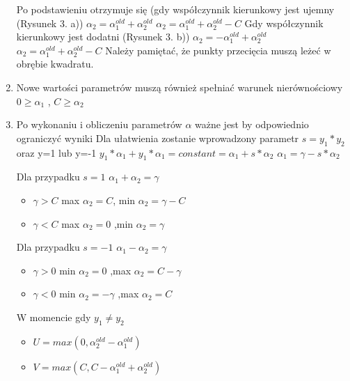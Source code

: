 \documentclass[11pt]{article}
\begin{document}
\begin{enumerate}
Po podstawieniu otrzymuje się (gdy współczynnik kierunkowy jest ujemny (Rysunek 3. a))
\newline 
$\alpha_{2} = \alpha_{1}^{old} + \alpha_{2}^{old}$
$\alpha_{2} = \alpha_{1}^{old} + \alpha_{2}^{old}-C$
\newline Gdy współczynnik kierunkowy jest dodatni (Rysunek 3. b))
\newline
$\alpha_{2} = -\alpha_{1}^{old} + \alpha_{2}^{old}$
$\alpha_{2} = \alpha_{1}^{old} + \alpha_{2}^{old}-C$
\newline Należy pamiętać, że punkty przecięcia muszą leżeć w obrębie kwadratu. 

\item Nowe wartości parametrów muszą również spełniać warunek nierównościowy
$0\ge\alpha_{1}$ ,
$C\ge\alpha_{2}$
\item Po wykonaniu i obliczeniu parametrów  $\alpha$ ważne jest by odpowiednio ograniczyć wyniki
\newline 
Dla ułatwienia zostanie wprowadzony parametr $s=y_{1}*y_{2}$ oraz y=1 lub y=-1 
\newline 
$y_{1}*\alpha_{1} + y_{1}*\alpha_{1} = constant = \alpha_{1} + s*\alpha_{2}$
\newline
$\alpha_{1} = \gamma - s*\alpha_{2}$

Dla przypadku $s=1$   
 \newline $\alpha_{1}+\alpha_{2} = \gamma$
 \begin{itemize}
\item $\gamma > C $ max $\alpha_{2} = C $, min $ \alpha_{2} = \gamma - C$
\item $\gamma < C$  max $\alpha_{2} = 0$ ,min  $\alpha_{2} = \gamma$
\end{itemize}
Dla przypadku $s=-1$
\newline $\alpha_{1}-\alpha_{2} = \gamma$
\begin{itemize}
\item $\gamma > 0$ min $\alpha_{2} = 0 $ ,max  $\alpha_{2} = C -\gamma $
\item $\gamma < 0$ min $\alpha_{2} = -\gamma$ ,max  $\alpha_{2} = C$
\end{itemize}
W momencie gdy  $y_{1}\neq y_{2}$ 
\begin{itemize}
 \item$ U = max(0,\alpha_{2}^{old} - \alpha_{1}^{old})$
 \item$ V = max(C,C - \alpha_{1}^{old} + \alpha_{2}^{old})$
 \end{itemize}



\end{enumerate}
\end{document}
